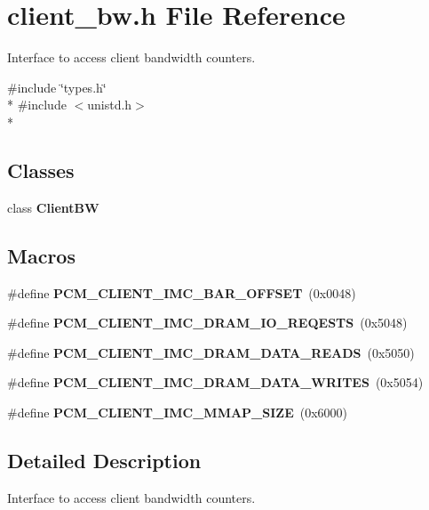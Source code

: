 \section{client\+\_\+bw.\+h File Reference}
\label{client__bw_8h}


Interface to access client bandwidth counters.  


{\ttfamily \#include \char`\"{}types.\+h\char`\"{}}\\*
{\ttfamily \#include $<$unistd.\+h$>$}\\*
\subsection*{Classes}
\begin{DoxyCompactItemize}
\item 
class {\bf Client\+B\+W}
\end{DoxyCompactItemize}
\subsection*{Macros}
\begin{DoxyCompactItemize}
\item 
\#define {\bfseries P\+C\+M\+\_\+\+C\+L\+I\+E\+N\+T\+\_\+\+I\+M\+C\+\_\+\+B\+A\+R\+\_\+\+O\+F\+F\+S\+E\+T}~(0x0048)\label{client__bw_8h_aa16cd48b0adede371be77dbc0be2fd9b}

\item 
\#define {\bfseries P\+C\+M\+\_\+\+C\+L\+I\+E\+N\+T\+\_\+\+I\+M\+C\+\_\+\+D\+R\+A\+M\+\_\+\+I\+O\+\_\+\+R\+E\+Q\+E\+S\+T\+S}~(0x5048)\label{client__bw_8h_a2afb60758e870c73eec7e100b6040b47}

\item 
\#define {\bfseries P\+C\+M\+\_\+\+C\+L\+I\+E\+N\+T\+\_\+\+I\+M\+C\+\_\+\+D\+R\+A\+M\+\_\+\+D\+A\+T\+A\+\_\+\+R\+E\+A\+D\+S}~(0x5050)\label{client__bw_8h_a125dc536cbcf631a395c40a183645e89}

\item 
\#define {\bfseries P\+C\+M\+\_\+\+C\+L\+I\+E\+N\+T\+\_\+\+I\+M\+C\+\_\+\+D\+R\+A\+M\+\_\+\+D\+A\+T\+A\+\_\+\+W\+R\+I\+T\+E\+S}~(0x5054)\label{client__bw_8h_aca3e4d8c51b41ea7c8465d3f89659796}

\item 
\#define {\bfseries P\+C\+M\+\_\+\+C\+L\+I\+E\+N\+T\+\_\+\+I\+M\+C\+\_\+\+M\+M\+A\+P\+\_\+\+S\+I\+Z\+E}~(0x6000)\label{client__bw_8h_aa0e78fbc5472bbfb796c575dd9c33dba}

\end{DoxyCompactItemize}


\subsection{Detailed Description}
Interface to access client bandwidth counters. 


